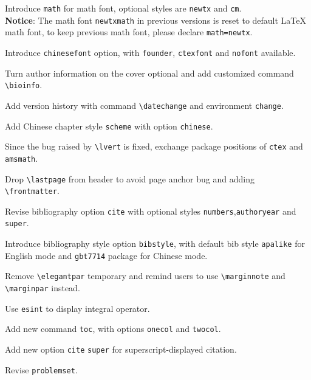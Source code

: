 \documentclass[11pt]{elegantbook}
\begin{document}
\begin{change}
  \item Introduce \lstinline{math} for math font, optional styles are \lstinline{newtx} and \lstinline{cm}.\\
  \textbf{Notice}: The math font \lstinline{newtxmath} in previous versions is reset to default \LaTeX{} math font, to keep previous math font, please declare \lstinline{math=newtx}.
  \item Introduce \lstinline{chinesefont} option, with \lstinline{founder}, \lstinline{ctexfont} and \lstinline{nofont} available.
  \item Turn author information on the cover optional and add customized command \lstinline{\bioinfo}.
  \item Add version history with command \lstinline{\datechange} and environment \lstinline{change}.
  \item Add Chinese chapter style \lstinline{scheme} with option \lstinline{chinese}.
  \item Since the bug raised by \lstinline{\lvert} is fixed, exchange package positions of \lstinline{ctex} and \lstinline{amsmath}.
  \item Drop \lstinline{\lastpage} from header to avoid page anchor bug and adding \lstinline{\frontmatter}.
  \item Revise bibliography option \lstinline{cite} with optional styles \lstinline{numbers},\lstinline{authoryear} and \lstinline{super}.
  \item Introduce bibliography style option \lstinline{bibstyle}, with default bib style \lstinline{apalike} for English mode and \lstinline{gbt7714} package for Chinese mode.
\end{change}


\begin{change}
  \item Remove \lstinline{\elegantpar} temporary and remind users to use \lstinline{\marginnote} and \lstinline{\marginpar} instead.
  \item Use \lstinline{esint} to display integral operator.
  \item Add new command \lstinline{toc}, with options  \lstinline{onecol} and \lstinline{twocol}.
  \item Add new option \lstinline{cite} \lstinline{super} for superscript-displayed citation.
  \item Revise \lstinline{problemset}.
\end{change}
\end{document}
